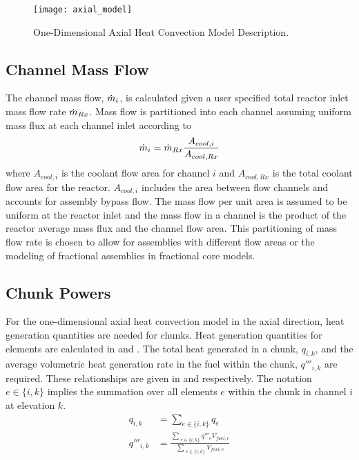     \begin{figure}
      \centering
      \texttt{[image: axial\_model]}
      \caption{One-Dimensional Axial Heat Convection Model Description.}
      \label{fig:axial_model}
    \end{figure}

  \subsection{Channel Mass Flow}
    The channel mass flow, $\dot{m}_i$, is calculated given a user specified total 
    reactor inlet mass flow rate $\dot{m}_{Rx}$. Mass flow is partitioned into
    each channel assuming uniform mass flux at each channel inlet according to 
    \begin{equation}
      \label{eq:mass_flow_split}
      \dot{m}_i = \dot{m}_{Rx} \frac{A_{cool,i}}{A_{cool,Rx}}
    \end{equation}
    where $A_{cool,i}$ is the coolant flow area for channel $i$ and
    $A_{cool,Rx}$ is the total coolant flow area for the reactor. $A_{cool,i}$
    includes the area between flow channels and 
    accounts for assembly bypass flow. The mass flow per unit area is assumed to
    be uniform at the reactor inlet and the mass flow in a channel is the
    product of the reactor average mass flux and the channel flow area. This
    partitioning of mass flow rate is chosen to allow for assemblies with
    different flow areas or the modeling of fractional assemblies in fractional
    core models.

  \subsection{Chunk Powers}
    For the one-dimensional axial heat convection model in the axial direction,
    heat generation quantities are needed for chunks. Heat generation quantities
    for elements are calculated in  and
    . The total heat generated in a chunk, $q_{i,k}$,
    and the average volumetric heat generation rate in the fuel 
    within the chunk, $q'''_{i,k}$ are required. These relationships are given
    in  and  respectively. The
    notation $e \in \{i,k\}$ implies the summation over all elements $e$ within
    the chunk in channel $i$ at elevation $k$.
    \begin{align}
      \label{eq:chunkpwr}
      q_{i,k} &= \sum_{e \in \{i,k\}} q_e \\
      \label{eq:chunkqppp_fuel}
      q'''_{i,k} &= \frac{\sum_{\; e \in \{i,k\}} q'''_e V_{fuel,e}}
        {\sum_{\; e \in \{i,k\}} V_{fuel,e}}
    \end{align}
  
